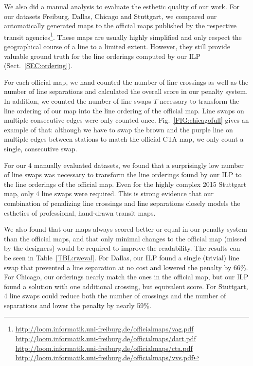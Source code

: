 \documentclass[format=acmsmall, review=false, screen=true]{acmart}
\begin{document}
We also did a manual analysis to evaluate the esthetic quality of our work. For our datasets Freiburg, Dallas, Chicago and Stuttgart, we compared our automatically generated maps to the official maps published by the respective transit agencies\footnote{\url{http://loom.informatik.uni-freiburg.de/officialmaps/vag.pdf}\\\url{http://loom.informatik.uni-freiburg.de/officialmaps/dart.pdf}\\\url{http://loom.informatik.uni-freiburg.de/officialmaps/cta.pdf}\\\url{http://loom.informatik.uni-freiburg.de/officialmaps/vvs.pdf}}.
These maps are usually highly simplified and only respect the geographical course of a line to a limited extent.
However, they still provide valuable ground truth for the line orderings computed by our ILP (Sect.~\ref{SEC:ordering}).

For each official map, we hand-counted the number of line crossings as well as the number of line separations and calculated the overall score in our penalty system.
In addition, we counted the number of line swaps $T$ necessary to transform the line ordering of our map into the line ordering of the official map.
Line swaps on multiple consecutive edges were only counted once. Fig.~\ref{FIG:chicagofull} gives an example of that: although we have to swap the brown and the purple line on multiple edges between stations to match the official CTA map, we only count a single, consecutive swap. 

For our 4 manually evaluated datasets, we found that a surprisingly low number of line swaps was necessary to transform the line orderings found by our ILP to the line orderings of the official map.
Even for the highly complex 2015 Stuttgart map, only 4 line swaps were required.
This is strong evidence that our combination of penalizing line crossings and line separations closely models the esthetics of professional, hand-drawn transit maps.

We also found that our maps always scored better or equal in our penalty system than the official maps, and that only minimal changes to the official map (missed by the designers) would be required to improve the readability.
The results can be seen in Table~\ref{TBL:rweval}.
For Dallas, our ILP found a single (trivial) line swap that prevented a line separation at no cost and lowered the penalty by 66\%.
For Chicago, our orderings nearly match the ones in the official map, but our ILP found a solution with one additional crossing, but equivalent score.
For Stuttgart, 4 line swaps could reduce both the number of crossings and the number of separations and lower the penalty by nearly 59\%.
\end{document}
